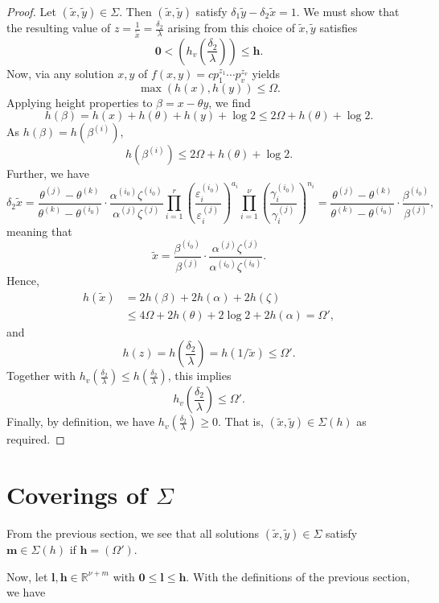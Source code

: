 \begin{proof}
Let $(\tilde{x},\tilde{y}) \in \Sigma$. Then $(\tilde{x},\tilde{y})$ satisfy $\delta_1\tilde{y}-\delta_2\tilde{x}=1$. We must show that the resulting value of $z = \frac{1}{\tilde{x}} = \frac{\delta_2}{\lambda}$ arising from this choice of $\tilde{x},\tilde{y}$ satisfies
\[\mathbf{0} < \left(h_v\left(\frac{\delta_2}{\lambda}\right)\right)\leq \mathbf{h}.\]
Now, via \cite{KanMat} any solution $x,y$ of $f(x,y) = c p_1^{z_1}\cdots p_v^{z_v}$ yields
\[\max(h(x),h(y)) \leq \Omega.\]
Applying height properties to $\beta = x-\theta y$, we find
\[h(\beta) = h(x) + h(\theta) + h(y) + \log{2}  \leq 2\Omega + h(\theta) + \log{2}.\]
As $h(\beta) = h(\beta^{(i)})$, 
\[h(\beta^{(i)}) \leq 2\Omega + h(\theta) + \log{2}.\]
Further, we have
\[\delta_2\tilde{x} 
	= \frac{\theta^{(j)} - \theta^{(k)}}{\theta^{(k)} - \theta^{(i_0)}}\cdot \frac{\alpha^{(i_0)}\zeta^{(i_0)}}{\alpha^{(j)}\zeta^{(j)}} \prod_{i = 1}^{r}\left( \frac{\varepsilon_i^{(i_0)}}{\varepsilon_i^{(j)}}\right)^{a_i} \prod_{i = 1}^{\nu} \left( \frac{\gamma_i^{(i_0)}}{\gamma_i^{(j)}}\right)^{n_i}  
	= \frac{\theta^{(j)} - \theta^{(k)}}{\theta^{(k)} - \theta^{(i_0)}}\cdot \frac{\beta^{(i_0)}}{\beta^{(j)}},\]
meaning that
\[\tilde{x} =\frac{\beta^{(i_0)}}{\beta^{(j)}}\cdot \frac{\alpha^{(j)}\zeta^{(j)}}{\alpha^{(i_0)}\zeta^{(i_0)}}.\]
Hence, 
\begin{align*}
h(\tilde{x})	
	& = 2h(\beta) + 2h(\alpha) + 2h(\zeta)\\
	& \leq 4\Omega + 2h(\theta) + 2\log{2} + 2h(\alpha) = \Omega',
\end{align*}
and 
\[h(z) = h\left(\frac{\delta_2}{\lambda}\right) = h(1/\tilde{x}) \leq \Omega'.\]
Together with $\displaystyle h_v\left(\frac{\delta_2}{\lambda}\right) \leq h\left(\frac{\delta_2}{\lambda}\right)$, this implies
\[h_v\left(\frac{\delta_2}{\lambda}\right) \leq \Omega'.\]
Finally, by definition, we have $h_v\left(\frac{\delta_2}{\lambda}\right) \geq 0$. That is, $(\tilde{x},\tilde{y}) \in \Sigma(h)$ as required. 
\end{proof}

\section{Coverings of $\Sigma$}

From the previous section, we see that all solutions $(\tilde{x},\tilde{y}) \in \Sigma$ satisfy $\mathbf{m}\in \Sigma(h)$ if ${\mathbf{h} = (\Omega')}$.

Now, let $\mathbf{l},\mathbf{h}\in\mathbb{R}^{\nu+m}$ with $\mathbf{0}\leq \mathbf{l}\leq \mathbf{h}$. With the definitions of the previous section, we have

